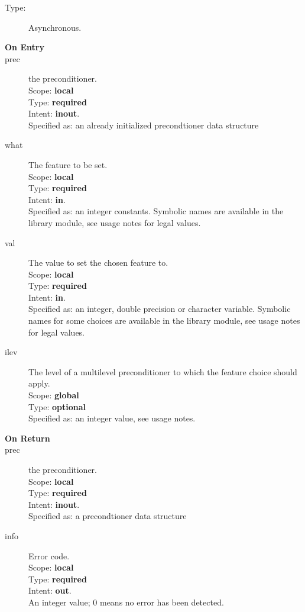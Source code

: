 \begin{description}
\item[Type:] Asynchronous.
\item[\bf On Entry]
\item[prec] the preconditioner.\\
Scope: {\bf local} \\
Type: {\bf required}\\
Intent: {\bf inout}.\\
Specified as: an already initialized precondtioner data structure \precdata\\
\item[what] The feature to be set. \\
Scope: {\bf local} \\
Type: {\bf required}\\
Intent: {\bf in}.\\
Specified as: an integer constants. Symbolic names are available in
the library module, see usage notes for legal values.
\item[val] The value  to set the chosen feature to. \\
Scope: {\bf local} \\
Type: {\bf required}\\
Intent: {\bf in}.\\
Specified as: an integer, double precision or character variable. 
Symbolic names for some choices are available in the library module,
see usage notes for legal values. 
\item[ilev] The level of a multilevel preconditioner to which the
  feature choice should apply.\\
Scope: {\bf global} \\
Type: {\bf optional}\\
Specified as: an integer value, see usage notes. 
\end{description}

\begin{description}
\item[\bf On Return]
\item[prec] the preconditioner.\\
Scope: {\bf local} \\
Type: {\bf required}\\
Intent: {\bf inout}.\\
Specified as: a precondtioner data structure \precdata\\
\item[info] Error code.\\
Scope: {\bf local} \\
Type: {\bf required} \\
Intent: {\bf out}.\\
An integer value; 0 means no error has been detected. 
\end{description}

